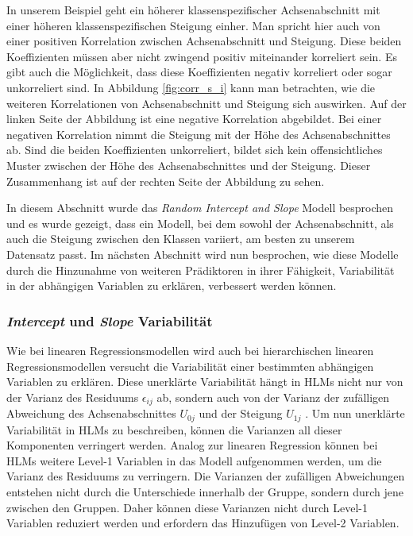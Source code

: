 \documentclass[12pt]{article}\usepackage[]{graphicx}\usepackage[]{color}
\begin{document}
In unserem Beispiel geht ein höherer klassenspezifischer Achsenabschnitt mit einer höheren klassenspezifischen Steigung einher. Man spricht hier auch von einer positiven Korrelation zwischen Achsenabschnitt und Steigung. Diese beiden Koeffizienten müssen aber nicht zwingend positiv miteinander korreliert sein. Es gibt auch die Möglichkeit, dass diese Koeffizienten negativ korreliert oder sogar unkorreliert sind. In Abbildung \ref{fig:corr_s_i} kann man betrachten, wie die weiteren Korrelationen von Achsenabschnitt und Steigung sich auswirken. Auf der linken Seite der Abbildung ist eine negative Korrelation abgebildet. Bei einer negativen Korrelation nimmt die Steigung mit der Höhe des Achsenabschnittes ab. Sind die beiden Koeffizienten unkorreliert, bildet sich kein offensichtliches Muster zwischen der Höhe des Achsenabschnittes und der Steigung. Dieser Zusammenhang ist auf der rechten Seite der Abbildung zu sehen.

In diesem Abschnitt wurde das \textit{Random Intercept and Slope} Modell besprochen und es wurde gezeigt, dass ein Modell, bei dem sowohl der Achsenabschnitt, als auch die Steigung zwischen den Klassen variiert, am besten zu unserem Datensatz passt. Im nächsten Abschnitt wird nun besprochen, wie diese Modelle durch die Hinzunahme von weiteren Prädiktoren in ihrer Fähigkeit, Variabilität in der abhängigen Variablen zu erklären, verbessert werden können.

\subsubsection{\textit{Intercept} und \textit{Slope} Variabilität} \label{section:variability}
Wie bei linearen Regressionsmodellen wird auch bei hierarchischen linearen Regressionsmodellen versucht die Variabilität einer bestimmten abhängigen Variablen zu erklären. Diese unerklärte Variabilität hängt in HLMs nicht nur von der Varianz des Residuums $\epsilon_{ij}$ ab, sondern auch von der Varianz der zufälligen Abweichung des Achsenabschnittes $U_{0j}$ und der Steigung $U_{1j}$ \citep{SnijdersTomA.B2012Ma:a}. Um nun unerklärte Variabilität in HLMs zu beschreiben, können die Varianzen all dieser Komponenten verringert werden. Analog zur linearen Regression können bei HLMs weitere Level-1 Variablen in das Modell aufgenommen werden, um die Varianz des Residuums zu verringern. Die Varianzen der zufälligen Abweichungen entstehen nicht durch die Unterschiede innerhalb der Gruppe, sondern durch jene zwischen den Gruppen. Daher können diese Varianzen nicht durch Level-1 Variablen reduziert werden und erfordern das Hinzufügen von Level-2 Variablen. 
\end{document}
